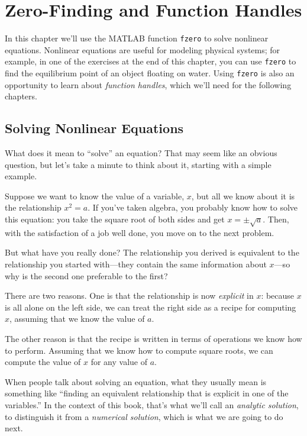 \chapter{Zero-Finding and Function Handles}
\label{fzero}


In this chapter we'll use the MATLAB function \lstinline{fzero} to solve nonlinear equations.
Nonlinear equations are useful for modeling physical systems; for example, in one of
the exercises at the end of this chapter, you can use \lstinline{fzero} to find the equilibrium point of an object floating on water.
Using \lstinline{fzero} is also an opportunity to learn about \emph{function handles}, which we'll need for the following chapters.

\section{Solving Nonlinear Equations}


What does it mean to ``solve'' an equation?  That may seem like an
obvious question, but let's take a minute to think about it,
starting with a simple \mbox{example}.

Suppose we want to know the
value of a variable, $x$, but all we know about it is the relationship
$x^2 = a$. If you've taken algebra, you probably  know how to solve this
equation: you take the square root of both sides and get
$x = \pm \sqrt{a}$.  Then, with the satisfaction of a job well done,
you move on to the next problem.


But what have you really done?  The relationship you derived is
equivalent to the relationship you started with---they contain the
same information about $x$---so why is the second one preferable
to the first?

There are two reasons.  One is that the relationship is now \emph{explicit} in $x$: because $x$ is all alone on the left side, we can treat the right side as a recipe for computing $x$, assuming that we know the value of $a$.


The other reason is that the recipe is written in terms of operations
we know how to perform.  Assuming that we know how to compute square
roots, we can compute the value of $x$ for any value of $a$.

When people talk about solving an equation, what they usually mean
is something like ``finding an equivalent relationship that is
explicit in one of the variables.''  In the context of this book,
that's what we'll call an \emph{analytic \mbox{solution}}, to distinguish
it from a \emph{numerical solution}, which is what we are going to
do next.

